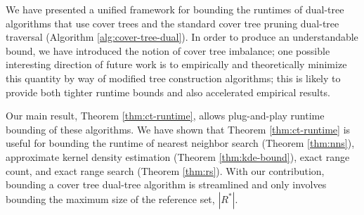 We have presented a unified framework for bounding the runtimes of dual-tree
algorithms that use cover trees and the standard cover tree pruning dual-tree
traversal (Algorithm \ref{alg:cover-tree-dual}).  In order to produce an
understandable bound, we have introduced the notion of cover tree imbalance; one
possible interesting direction of future work is to empirically and
theoretically minimize this quantity by way of modified tree construction
algorithms; this is likely to provide both tighter runtime bounds and also
accelerated empirical results.

Our main result, Theorem \ref{thm:ct-runtime}, allows plug-and-play runtime
bounding of these algorithms.  We have shown that Theorem \ref{thm:ct-runtime}
is useful for bounding the runtime of nearest neighbor search (Theorem
\ref{thm:nns}), approximate kernel density estimation (Theorem
\ref{thm:kde-bound}), exact range count, and exact range search (Theorem
\ref{thm:rs}).  With our contribution, bounding a cover tree dual-tree algorithm
is streamlined and only involves bounding the maximum size of the reference
set, $| R^* |$.
